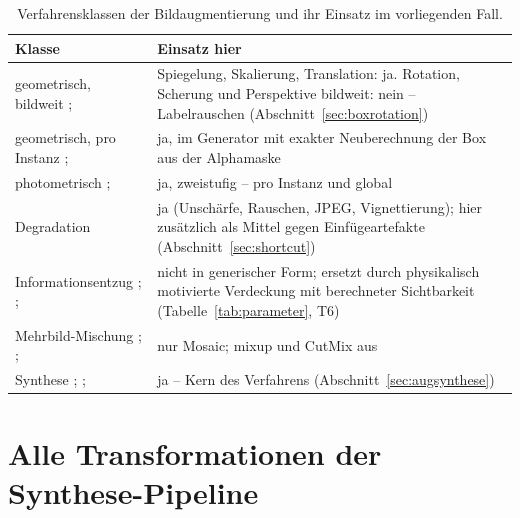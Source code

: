 \begin{table}[htbp]
\centering
\caption[Verfahrensklassen der Bildaugmentierung]{Verfahrensklassen der
Bildaugmentierung und ihr Einsatz im vorliegenden Fall.}
\label{tab:taxonomie}
\footnotesize
\begin{tabularx}{\textwidth}{@{}L{0.19\textwidth}X@{}}
\toprule
\textbf{Klasse} & \textbf{Einsatz hier} \\
\midrule
geometrisch, bildweit \newline
\scriptsize\cite{krizhevsky2012}; \cite{simard2003} &
Spiegelung, Skalierung, Translation: ja. Rotation, Scherung und Perspektive
bildweit: nein -- Labelrauschen (Abschnitt~\ref{sec:boxrotation}) \\
\addlinespace
geometrisch, pro Instanz \newline
\scriptsize\cite{dwibedi2017}; \cite{ghiasi2021} &
ja, im Generator mit exakter Neuberechnung der Box aus der Alphamaske \\
\addlinespace
photometrisch \newline
\scriptsize\cite{krizhevsky2012}; \cite{grossberg2003} &
ja, zweistufig -- pro Instanz und global \\
\addlinespace
Degradation \newline
\scriptsize\cite{hendrycks2019} &
ja (Unschärfe, Rauschen, JPEG, Vignettierung); hier zusätzlich als Mittel gegen
Einfügeartefakte (Abschnitt~\ref{sec:shortcut}) \\
\addlinespace
Informationsentzug \newline
\scriptsize\cite{devries2017cutout}; \cite{zhong2020erasing};
\cite{singh2017hideseek} &
nicht in generischer Form; ersetzt durch physikalisch motivierte Verdeckung mit
berechneter Sichtbarkeit (Tabelle~\ref{tab:parameter}, T6) \\
\addlinespace
Mehrbild-Mischung \newline
\scriptsize\cite{zhang2018mixup}; \cite{yun2019cutmix}; \cite{bochkovskiy2020} &
nur Mosaic; mixup und CutMix aus \\
\addlinespace
Synthese \newline
\scriptsize\cite{dvornik2018}; \cite{tobin2017}; \cite{tremblay2018} &
ja -- Kern des Verfahrens (Abschnitt~\ref{sec:augsynthese}) \\
\bottomrule
\end{tabularx}
\end{table}

\section{Alle Transformationen der Synthese-Pipeline}

